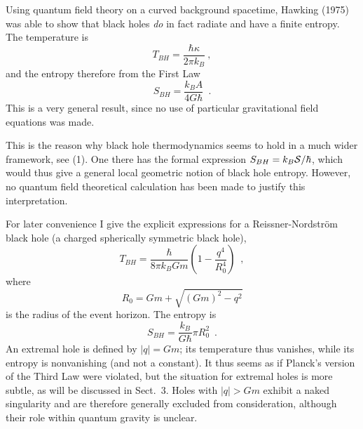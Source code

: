 \documentclass[12pt]{article}
\newcommand{\be}{\begin{equation}}
\newcommand{\ee}{\end{equation}}
\begin{document}
Using quantum field theory on a curved background
spacetime, Hawking (1975) was able to show that black holes
{\em do} in fact radiate and have a finite entropy. The temperature is
\be T_{BH}=\frac{\hbar\kappa}{2\pi k_B}\ , \ee
and the entropy therefore from the First Law
\be S_{BH}=\frac{k_BA}{4G\hbar}\enspace . \ee
This is a very general result, since no use of particular
gravitational field equations was made.

\vskip 2mm

This is the reason why black hole thermodynamics seems to hold
in a much wider framework, see (1). One there has
the formal expression $S_{BH}=
k_B{\cal S}/\hbar$, which would thus give a general local geometric
notion of black hole entropy. However, no quantum field theoretical
calculation has been made to justify this interpretation.

\vskip 2mm
\normalsize

For later convenience I give the explicit expressions for a
Reissner-Nordstr\"om black hole (a charged spherically symmetric
black hole),
\be T_{BH}=\frac{\hbar}{8\pi k_BGm}\left(1-\frac{q^4}{R_0^4}
    \right)\enspace , \ee
where
\be R_0=Gm+\sqrt{(Gm)^2-q^2} \ee
is the radius of the event horizon. The entropy is
\be S_{BH}=\frac{k_B}{G\hbar}\pi R_0^2\enspace .\ee
An extremal hole is defined by $\vert q\vert=Gm$; its temperature
thus vanishes, while its entropy is nonvanishing
 (and not a constant).
It thus seems as if Planck's version of the Third Law were violated,
but the situation for extremal holes is more subtle, as will
be discussed in Sect.~3. Holes with $\vert q\vert>Gm$ exhibit
a naked singularity and are therefore generally excluded
from consideration, although their role within quantum gravity
is unclear.
\end{document}
